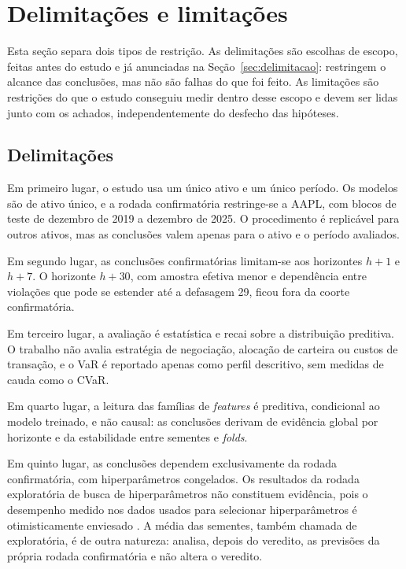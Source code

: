 \section{Delimitações e limitações} \label{sec:limitacoes}
Esta seção separa dois tipos de restrição. As delimitações são escolhas de escopo, feitas antes do estudo e já anunciadas na Seção~\ref{sec:delimitacao}: restringem o alcance das conclusões, mas não são falhas do que foi feito. As limitações são restrições do que o estudo conseguiu medir dentro desse escopo e devem ser lidas junto com os achados, independentemente do desfecho das hipóteses.

\subsection{Delimitações}
Em primeiro lugar, o estudo usa um único ativo e um único período. Os modelos são de ativo único, e a rodada confirmatória restringe-se a AAPL, com blocos de teste de dezembro de 2019 a dezembro de 2025. O procedimento é replicável para outros ativos, mas as conclusões valem apenas para o ativo e o período avaliados.

Em segundo lugar, as conclusões confirmatórias limitam-se aos horizontes \(h+1\) e \(h+7\). O horizonte \(h+30\), com amostra efetiva menor e dependência entre violações que pode se estender até a defasagem 29, ficou fora da coorte confirmatória.

Em terceiro lugar, a avaliação é estatística e recai sobre a distribuição preditiva. O trabalho não avalia estratégia de negociação, alocação de carteira ou custos de transação, e o VaR é reportado apenas como perfil descritivo, sem medidas de cauda como o CVaR.

Em quarto lugar, a leitura das famílias de \textit{features} é preditiva, condicional ao modelo treinado, e não causal: as conclusões derivam de evidência global por horizonte e da estabilidade entre sementes e \textit{folds}.

Em quinto lugar, as conclusões dependem exclusivamente da rodada confirmatória, com hiperparâmetros congelados. Os resultados da rodada exploratória de busca de hiperparâmetros não constituem evidência, pois o desempenho medido nos dados usados para selecionar hiperparâmetros é otimisticamente enviesado \cite{RASCHKA2018}. A média das sementes, também chamada de exploratória, é de outra natureza: analisa, depois do veredito, as previsões da própria rodada confirmatória e não altera o veredito.

